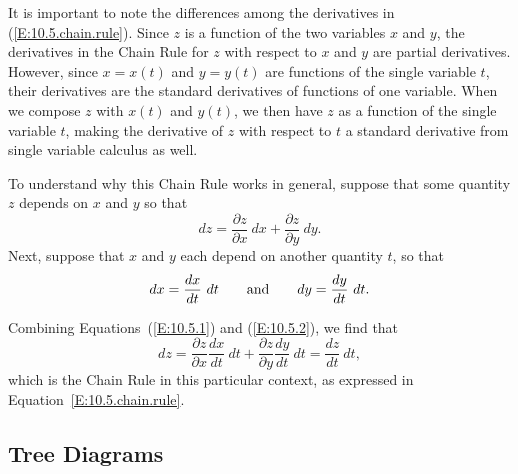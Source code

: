 \vspace*{5pt}
\nin {}
\vspace*{5pt}

It is important to note the differences among the derivatives in (\ref{E:10.5.chain.rule}). Since $z$ is a function of the two variables $x$ and $y$, the derivatives in the Chain Rule for $z$ with respect to $x$ and $y$ are partial derivatives. However, since $x = x(t)$ and $y = y(t)$ are functions of the single variable $t$, their derivatives are the standard derivatives of functions of one variable. When we compose $z$ with $x(t)$ and $y(t)$, we then have $z$ as a function of the single variable $t$, making the derivative of $z$ with respect to $t$ a standard derivative from single variable calculus as well.

To understand why this Chain Rule works in general, suppose that some quantity $z$ depends on $x$ and $y$ so
that
\begin{equation}
  dz = \frac{\partial z}{\partial x}~dx + \frac{\partial z}{\partial
    y}~dy.
  \label{E:10.5.1}
\end{equation}
Next, suppose that $x$ and $y$ each depend on another quantity $t$, so that
\begin{equation}
  dx = \frac{dx}{dt}~dt
  \hspace*{20pt}
  \mbox{and}
  \hspace*{20pt}
  dy = \frac{dy}{dt}~dt.
  \label{E:10.5.2}
\end{equation}
    
Combining Equations~(\ref{E:10.5.1}) and (\ref{E:10.5.2}), we find that
$$
dz = \frac{\partial z}{\partial x}\frac{dx}{dt}~dt 
+ \frac{\partial z}{\partial y}\frac{dy}{dt}~dt = \frac{dz}{dt}~dt,
$$
which is the Chain Rule in this particular context, as expressed in Equation~\ref{E:10.5.chain.rule}.



\subsection*{Tree Diagrams}

